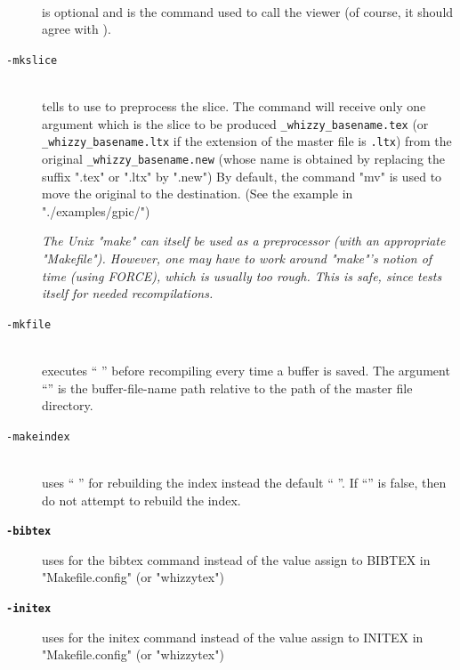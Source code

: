 \documentclass[12pt]{article}
\begin{document}
\begin{description}
\begin{description}
\item[]\indent\\
is optional and is the command used to call the viewer
(of course, it should agree with ). 

\item[\texttt{-mkslice} ]\indent\\
tells {\whizzy} to use   to preprocess the slice. 
The command  will receive only one argument
which is the slice to be produced \texttt{\_whizzy\_basename.tex} 
(or \texttt{\_whizzy\_basename.ltx} if the extension of the master file is 
\texttt{.ltx}) from the original \texttt{\_whizzy\_basename.new} 
(whose name is obtained by replacing the suffix ".tex" or ".ltx" by ".new")
By default, the command \lst"mv" is  used to move the original to the
destination. (See the example in \lst"./examples/gpic/")

{\em The Unix \lst"make"  can itself be used as a preprocessor (with an
appropriate \lst"Makefile").  However, one may have to work around
\lst"make"'s notion of time (using FORCE), which is usually too rough. 
This is safe, since {\whizzy} tests itself for needed recompilations.}

\item[\texttt{-mkfile} ]\indent\\
executes `` '' before recompiling every time a
buffer is saved. The argument ``'' is the buffer-file-name
path relative to the path of the master file directory.

\item[\texttt{-makeindex} ]\indent\\
uses `` '' for rebuilding the index instead
the default `` ''.  If ``'' is
false, then do not attempt to rebuild the index.

\item[{\bf {\tt -bibtex }}]\indent

uses  for the bibtex command instead of the value 
assign to BIBTEX in \lst"Makefile.config" (or \lst"whizzytex")

\item[{\bf {\tt -initex }}]\indent

uses  for the initex command instead of the value 
assign to INITEX in \lst"Makefile.config" (or \lst"whizzytex")


\end{description}
\end{description}
\end{document}

